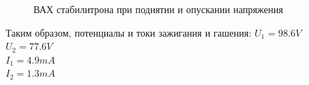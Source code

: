 \documentclass[a4paper,12pt]{article}
\begin{document}
\begin{figure}[h]
\caption{ВАХ стабилитрона при поднятии и опускании напряжения}
\label{fig:relation1}
\end{figure}
Таким образом, потенциалы и токи зажигания и гашения: 
$U_1 = 98.6 V$\\
$U_2 = 77.6 V$\\
$I_1 = 4.9 mA$\\
$I_2 = 1.3 mA$\\
\end{document}
